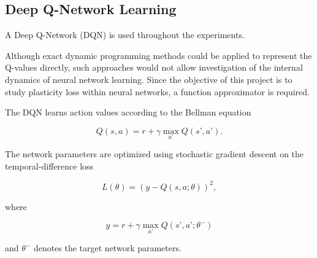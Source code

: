 \subsection{Deep Q-Network Learning}

A Deep Q-Network (DQN) \citep{mnih2015human} is used throughout the experiments.

Although exact dynamic programming methods could be applied to represent the Q-values directly, such approaches would not allow investigation of the internal dynamics of neural network learning. Since the objective of this project is to study plasticity loss within neural networks, a function approximator is required.

The DQN learns action values according to the Bellman equation

\begin{equation}
Q(s,a)
=
r
+
\gamma
\max_{a’}
Q(s’,a’).
\end{equation}

The network parameters are optimized using stochastic gradient descent on the temporal-difference loss

\begin{equation}
L(\theta)
=
\left(
y
-
Q(s,a; \theta)
\right)^2,
\end{equation}

where

\begin{equation}
y =
r
+
\gamma
\max_{a’}
Q(s’,a’;\theta^{-})
\end{equation}

and $\theta^{-}$ denotes the target network parameters.







